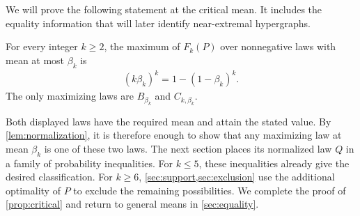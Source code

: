 We will prove the following statement at the critical mean. It includes the equality information that will later identify near-extremal hypergraphs.

\begin{proposition}\label{prop:critical}
For every integer $k\ge2$, the maximum of $F_k(P)$ over nonnegative laws with mean at most $\beta_k$ is
\begin{align*}
 (k\beta_k)^k=1-(1-\beta_k)^k.
\end{align*}
The only maximizing laws are $B_{\beta_k}$ and $C_{k,\beta_k}$.
\end{proposition}

Both displayed laws have the required mean and attain the stated value. By \cref{lem:normalization}, it is therefore enough to show that any maximizing law at mean $\beta_k$ is one of these two laws. The next section places its normalized law $Q$ in a family of probability inequalities. For $k\le5$, these inequalities already give the desired classification. For $k\ge6$, \cref{sec:support,sec:exclusion} use the additional optimality of $P$ to exclude the remaining possibilities. We complete the proof of \cref{prop:critical} and return to general means in \cref{sec:equality}.
